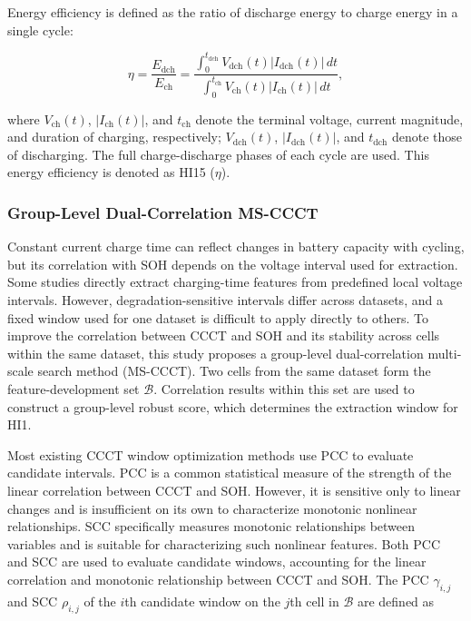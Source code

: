 Energy efficiency is defined as the ratio of discharge energy to charge energy in a single cycle\cite{ref66}:

\begin{equation}
\eta=\frac{E_{\mathrm{dch}}}{E_{\mathrm{ch}}}=\frac{\int_0^{t_{\mathrm{dch}}}V_{\mathrm{dch}}(t)\left|I_{\mathrm{dch}}(t)\right|\,dt}{\int_0^{t_{\mathrm{ch}}}V_{\mathrm{ch}}(t)\left|I_{\mathrm{ch}}(t)\right|\,dt},
\end{equation}

where $V_{\mathrm{ch}}(t)$, $|I_{\mathrm{ch}}(t)|$, and $t_{\mathrm{ch}}$ denote the terminal voltage, current magnitude, and duration of charging, respectively; $V_{\mathrm{dch}}(t)$, $|I_{\mathrm{dch}}(t)|$, and $t_{\mathrm{dch}}$ denote those of discharging. The full charge-discharge phases of each cycle are used. This energy efficiency is denoted as HI15 ($\eta$).



\FloatBarrier

\subsubsection{Group-Level Dual-Correlation MS-CCCT}
\label{sec:ms-ccct}

Constant current charge time can reflect changes in battery capacity with cycling, but its correlation with SOH depends on the voltage interval used for extraction. Some studies directly extract charging-time features from predefined local voltage intervals\cite{ref28,ref63}. However, degradation-sensitive intervals differ across datasets, and a fixed window used for one dataset is difficult to apply directly to others. To improve the correlation between CCCT and SOH and its stability across cells within the same dataset, this study proposes a group-level dual-correlation multi-scale search method (MS-CCCT). Two cells from the same dataset form the feature-development set $\mathcal{B}$. Correlation results within this set are used to construct a group-level robust score, which determines the extraction window for HI1.

Most existing CCCT window optimization methods use PCC to evaluate candidate intervals\cite{ref31,ref51}. PCC is a common statistical measure of the strength of the linear correlation between CCCT and SOH. However, it is sensitive only to linear changes and is insufficient on its own to characterize monotonic nonlinear relationships. SCC specifically measures monotonic relationships between variables and is suitable for characterizing such nonlinear features. Both PCC and SCC are used to evaluate candidate windows, accounting for the linear correlation and monotonic relationship between CCCT and SOH\cite{ref25,ref55,ref53}. The PCC $\gamma_{i,j}$ and SCC $\rho_{i,j}$ of the $i$th candidate window on the $j$th cell in $\mathcal{B}$ are defined as

